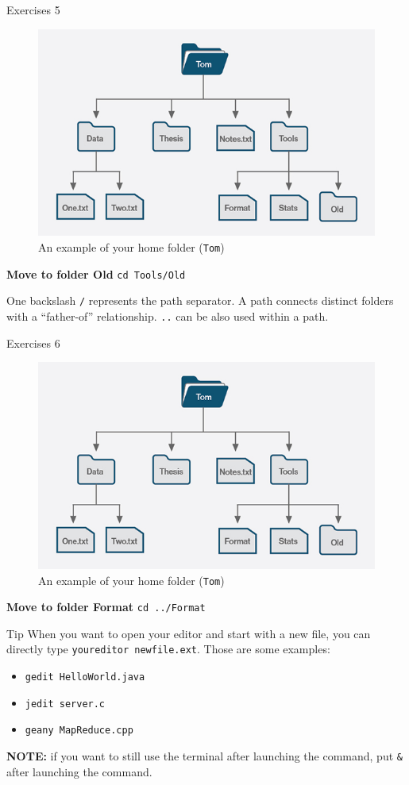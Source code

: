 \documentclass{beamer}
\begin{document}
\begin{frame}{Exercises 5}
	\begin{figure}
		\centering
		\includegraphics[width=0.7\linewidth]{00shell}
		\caption{An example of your home folder (\texttt{Tom})}
		\label{fig:00shell}
	\end{figure}
	\textbf{Move to folder Old} \pause \texttt{cd Tools/Old}
	
	One backslash \texttt{/} represents the path separator. A path connects distinct folders with a ``father-of'' relationship.
	\texttt{..} can be also used within a path.
\end{frame}

\begin{frame}{Exercises 6}
	\begin{figure}
		\centering
		\includegraphics[width=0.7\linewidth]{00shell}
		\caption{An example of your home folder (\texttt{Tom})}
		\label{fig:00shell}
	\end{figure}
	\textbf{Move to folder Format} \pause \texttt{cd ../Format}
\end{frame}

\begin{frame}{Tip}
	When you want to open your editor and start with a new file, you can directly type \texttt{youreditor newfile.ext}. Those are some examples:
	\begin{itemize}
		\item \texttt{gedit HelloWorld.java}
		\item \texttt{jedit server.c}
		\item \texttt{geany MapReduce.cpp}
	\end{itemize}
 \textbf{NOTE:} if you want to still use the terminal after launching the command, put \texttt{\&} after launching the command.
\end{frame}
\end{document}
